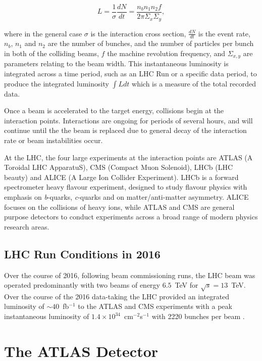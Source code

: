 	\begin{equation}
		L = \frac{1}{\sigma}\frac{dN}{dt} = \frac{n_bn_1n_2f}{2\pi\Sigma_x\Sigma_y},
	\end{equation}

	where in the general case $\sigma$ is the interaction cross section, $\frac{dN}{dt}$ is the event rate, $n_b$, $n_1$ and $n_2$ are the number of bunches, and the number of particles per bunch in both of the colliding beams, $f$ the machine revolution frequency, and $\Sigma_{x, y}$ are parameters relating to the beam width. This instantaneous luminosity is integrated across a time period, such as an LHC Run or a specific data period, to produce the integrated luminosity $\int L dt$ which is a measure of the total recorded data.

	Once a beam is accelerated to the target energy, collisions begin at the interaction points. Interactions are ongoing for periods of several hours, and will continue until the the beam is replaced due to general decay of the interaction rate or beam instabilities occur.

	At the LHC, the four large experiments at the interaction points are ATLAS \cite{ATLAS}(A Toroidal LHC ApparatuS), CMS \cite{CMS}(Compact Muon Solenoid), LHCb \cite{LHCB}(LHC beauty) and ALICE \cite{ALICE}(A Large Ion Collider Experiment). LHCb is a forward spectrometer heavy flavour experiment, designed to study flavour physics with emphasis on \textit{b}-quarks, \textit{c}-quarks and on matter/anti-matter asymmetry. ALICE focuses on the collisions of heavy ions, while ATLAS and CMS are general purpose detectors to conduct experiments across a broad range of modern physics research areas.

	\subsection{LHC Run Conditions in 2016}

	Over the course of 2016, following beam commissioning runs, the LHC beam was operated predominantly with two beams of energy $6.5$~TeV for $\sqrt{s}=13$~TeV. Over the course of the 2016 data-taking the LHC provided an integrated luminosity of $\sim40$~fb$^{-1}$ to the ATLAS and CMS experiments with a peak instantaneous luminosity of $1.4\times10^{34}$~cm$^{-2}$s$^{-1}$ with 2220 bunches per beam \cite{Run2016}.


\newpage
\section{The ATLAS Detector}
\label{d:ATLAS}

